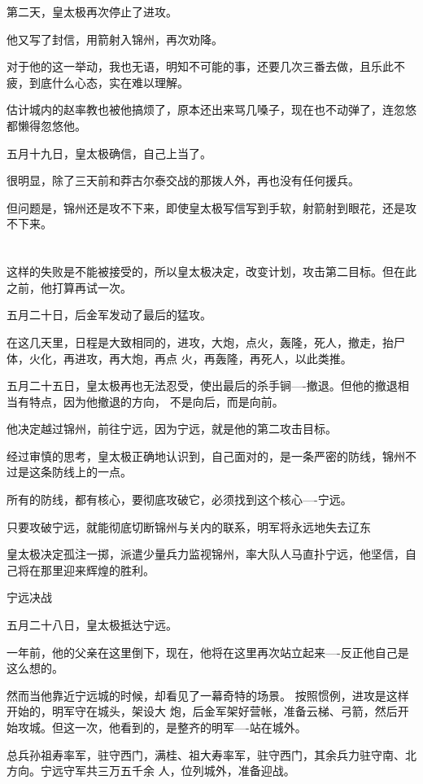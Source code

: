 \documentclass[11pt,a4paper,onecolumn]{article}
\begin{document}
第二天，皇太极再次停止了进攻。

他又写了封信，用箭射入锦州，再次劝降。

对于他的这一举动，我也无语，明知不可能的事，还要几次三番去做，且乐此不疲，到底什么心态，实在难以理解。

估计城内的赵率教也被他搞烦了，原本还出来骂几嗓子，现在也不动弹了，连忽悠都懒得忽悠他。

五月十九日，皇太极确信，自己上当了。

很明显，除了三天前和莽古尔泰交战的那拨人外，再也没有任何援兵。

但问题是，锦州还是攻不下来，即使皇太极写信写到手软，射箭射到眼花，还是攻不下来。

\section[\thesection]{}

这样的失败是不能被接受的，所以皇太极决定，改变计划，攻击第二目标。但在此之前，他打算再试一次。

五月二十日，后金军发动了最后的猛攻。

在这几天里，日程是大致相同的，进攻，大炮，点火，轰隆，死人，撤走，抬尸体，火化，再进攻，再大炮，再点
火，再轰隆，再死人，以此类推。

五月二十五日，皇太极再也无法忍受，使出最后的杀手锏----撤退。但他的撤退相当有特点，因为他撤退的方向，
不是向后，而是向前。

他决定越过锦州，前往宁远，因为宁远，就是他的第二攻击目标。

经过审慎的思考，皇太极正确地认识到，自己面对的，是一条严密的防线，锦州不过是这条防线上的一点。

所有的防线，都有核心，要彻底攻破它，必须找到这个核心----宁远。

只要攻破宁远，就能彻底切断锦州与关内的联系，明军将永远地失去辽东

皇太极决定孤注一掷，派遣少量兵力监视锦州，率大队人马直扑宁远，他坚信，自己将在那里迎来辉煌的胜利。

宁远决战

五月二十八日，皇太极抵达宁远。

一年前，他的父亲在这里倒下，现在，他将在这里再次站立起来----反正他自己是这么想的。

然而当他靠近宁远城的时候，却看见了一幕奇特的场景。 按照惯例，进攻是这样开始的，明军守在城头，架设大
炮，后金军架好营帐，准备云梯、弓箭，然后开始攻城。但这一次，他看到的，是整齐的明军----站在城外。

总兵孙祖寿率军，驻守西门，满桂、祖大寿率军，驻守西门，其余兵力驻守南、北方向。宁远守军共三万五千余
人，位列城外，准备迎战。
\end{document}
